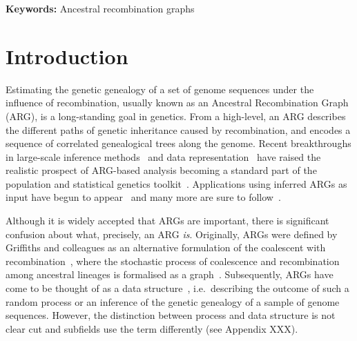 \documentclass{article}
\begin{document}
\textbf{Keywords:} Ancestral recombination graphs

\section*{Introduction}
Estimating the genetic genealogy of a set of genome sequences
under the influence of recombination,
usually known as an Ancestral Recombination Graph (ARG), is a long-standing
goal in genetics.
From a high-level, an ARG describes the different paths of genetic inheritance
caused by recombination, and encodes a sequence of correlated genealogical
trees along the genome.
Recent breakthroughs
in large-scale inference
methods~\citep{rasmussen2014genome,kelleher2019inferring,speidel2019method,
schaefer2021ancestral,wohns2022unified,zhang2023biobank,zhan2023towards}
and data representation~\citep{kelleher2016efficient,kelleher2018efficient}
have raised the realistic prospect of ARG-based analysis becoming a standard part
of the population and statistical genetics toolkit~\citep{hejase2020summary}.
Applications using inferred ARGs as input have begun to
appear~\citep{osmond2021estimating,fan2022genealogical,hejase2022deep,zhang2023biobank,
nowbandegani2023extremely}
and many more are sure to
follow~\citep{harris2019database,harris2023using}.

Although it is widely accepted that ARGs are important, there is significant
confusion about what, precisely, an ARG \emph{is}.
Originally, ARGs were defined by Griffiths and colleagues as an alternative
formulation of the coalescent with recombination~\citep{hudson1983properties},
where the stochastic process of coalescence and recombination
among ancestral lineages is formalised as a
graph~\citep{griffiths1991two,ethier1990two,griffiths1996ancestral,griffiths1997ancestral}.
Subsequently, ARGs have come to be thought of as a data
structure~\citep{minichiello2006mapping}, i.e.\ describing
the outcome of such a random process or an inference
of the genetic genealogy of a sample of genome sequences.
However, the distinction between process and data structure is not clear cut
and subfields use the term
differently (see Appendix XXX).
\end{document}
